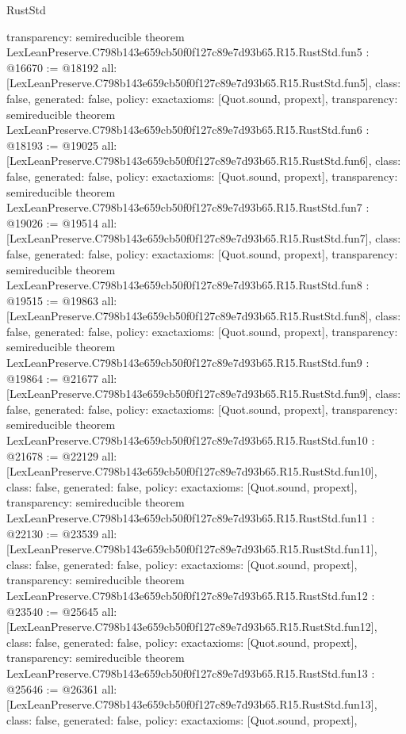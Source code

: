\begin{lexlean}{RustStd}
\begin{coremodule}
{  transparency: semireducible
}
theorem LexLeanPreserve.C798b143e659cb50f0f127c89e7d93b65.R15.RustStd.fun5 : @16670 := @18192 {
  all: [LexLeanPreserve.C798b143e659cb50f0f127c89e7d93b65.R15.RustStd.fun5],
  class: false,
  generated: false,
  policy: exact{axioms: [Quot.sound, propext]},
  transparency: semireducible
}
theorem LexLeanPreserve.C798b143e659cb50f0f127c89e7d93b65.R15.RustStd.fun6 : @18193 := @19025 {
  all: [LexLeanPreserve.C798b143e659cb50f0f127c89e7d93b65.R15.RustStd.fun6],
  class: false,
  generated: false,
  policy: exact{axioms: [Quot.sound, propext]},
  transparency: semireducible
}
theorem LexLeanPreserve.C798b143e659cb50f0f127c89e7d93b65.R15.RustStd.fun7 : @19026 := @19514 {
  all: [LexLeanPreserve.C798b143e659cb50f0f127c89e7d93b65.R15.RustStd.fun7],
  class: false,
  generated: false,
  policy: exact{axioms: [Quot.sound, propext]},
  transparency: semireducible
}
theorem LexLeanPreserve.C798b143e659cb50f0f127c89e7d93b65.R15.RustStd.fun8 : @19515 := @19863 {
  all: [LexLeanPreserve.C798b143e659cb50f0f127c89e7d93b65.R15.RustStd.fun8],
  class: false,
  generated: false,
  policy: exact{axioms: [Quot.sound, propext]},
  transparency: semireducible
}
theorem LexLeanPreserve.C798b143e659cb50f0f127c89e7d93b65.R15.RustStd.fun9 : @19864 := @21677 {
  all: [LexLeanPreserve.C798b143e659cb50f0f127c89e7d93b65.R15.RustStd.fun9],
  class: false,
  generated: false,
  policy: exact{axioms: [Quot.sound, propext]},
  transparency: semireducible
}
theorem LexLeanPreserve.C798b143e659cb50f0f127c89e7d93b65.R15.RustStd.fun10 : @21678 := @22129 {
  all: [LexLeanPreserve.C798b143e659cb50f0f127c89e7d93b65.R15.RustStd.fun10],
  class: false,
  generated: false,
  policy: exact{axioms: [Quot.sound, propext]},
  transparency: semireducible
}
theorem LexLeanPreserve.C798b143e659cb50f0f127c89e7d93b65.R15.RustStd.fun11 : @22130 := @23539 {
  all: [LexLeanPreserve.C798b143e659cb50f0f127c89e7d93b65.R15.RustStd.fun11],
  class: false,
  generated: false,
  policy: exact{axioms: [Quot.sound, propext]},
  transparency: semireducible
}
theorem LexLeanPreserve.C798b143e659cb50f0f127c89e7d93b65.R15.RustStd.fun12 : @23540 := @25645 {
  all: [LexLeanPreserve.C798b143e659cb50f0f127c89e7d93b65.R15.RustStd.fun12],
  class: false,
  generated: false,
  policy: exact{axioms: [Quot.sound, propext]},
  transparency: semireducible
}
theorem LexLeanPreserve.C798b143e659cb50f0f127c89e7d93b65.R15.RustStd.fun13 : @25646 := @26361 {
  all: [LexLeanPreserve.C798b143e659cb50f0f127c89e7d93b65.R15.RustStd.fun13],
  class: false,
  generated: false,
  policy: exact{axioms: [Quot.sound, propext]},
}
\end{coremodule}
\end{lexlean}
